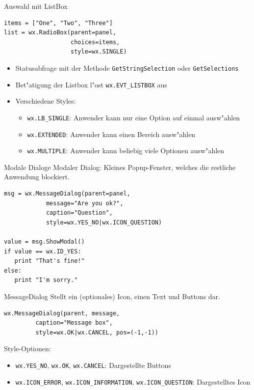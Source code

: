 \begin{frame}[fragile]{Auswahl mit ListBox}
\begin{lstlisting}[style=Python]
items = ["One", "Two", "Three"]
list = wx.RadioBox(parent=panel,
                   choices=items,
                   style=wx.SINGLE)
\end{lstlisting}
\begin{itemize}
\item Statusabfrage mit der Methode \lstinline{GetStringSelection} oder \lstinline{GetSelections}
\item Bet"atigung der Listbox l"ost \lstinline{wx.EVT_LISTBOX} aus
\item Verschiedene Styles:
\begin{itemize}
\item \lstinline{wx.LB_SINGLE}: Anwender kann nur eine Option auf einmal ausw"ahlen
\item \lstinline{wx.EXTENDED}: Anwender kann einen Bereich ausw"ahlen
\item \lstinline{wx.MULTIPLE}: Anwender kann beliebig viele Optionen ausw"ahlen
\end{itemize}
\end{itemize}
\end{frame}


\begin{frame}[fragile]{Modale Dialoge}
\alert{Modaler Dialog}: Kleines Popup-Fenster, welches die restliche Anwendung blockiert.
\begin{lstlisting}[style=Python]
msg = wx.MessageDialog(parent=panel,
            message="Are you ok?",
            caption="Question",
            style=wx.YES_NO|wx.ICON_QUESTION)

value = msg.ShowModal()
if value == wx.ID_YES:
   print "That's fine!"
else:
   print "I'm sorry."
\end{lstlisting}
\end{frame}

\begin{frame}[fragile]{MessageDialog}
Stellt ein (optionales) Icon, einen Text und Buttons dar.
\begin{lstlisting}[style=Python]
wx.MessageDialog(parent, message,
         caption="Message box",
         style=wx.OK|wx.CANCEL, pos=(-1,-1))
\end{lstlisting}
Style-Optionen:
\begin{itemize}
\item \lstinline{wx.YES_NO}, \lstinline{wx.OK},  \lstinline{wx.CANCEL}: Dargestellte Buttons
\item \lstinline{wx.ICON_ERROR}, \lstinline{wx.ICON_INFORMATION}, \lstinline{wx.ICON_QUESTION}: Dargestelltes Icon
\end{itemize}
\end{frame}


